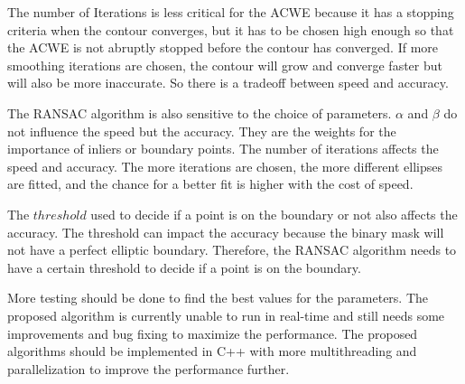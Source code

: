 The number of Iterations is less critical for the ACWE because it has a stopping criteria when the contour converges, but it has to be chosen high enough so that the ACWE is not abruptly stopped before the contour has converged. If more smoothing iterations are chosen, the contour will grow and converge faster but will also be more inaccurate. So there is a tradeoff between speed and accuracy. 

The RANSAC algorithm is also sensitive to the choice of parameters. $\alpha$ and $\beta$ do not influence the speed but the accuracy. They are the weights for the importance of inliers or boundary points. The number of iterations affects the speed and accuracy. The more iterations are chosen, the more different ellipses are fitted, and the chance for a better fit is higher with the cost of speed.

The $threshold$ used to decide if a point is on the boundary or not also affects the accuracy. The threshold can impact the accuracy because the binary mask will not have a perfect elliptic boundary. Therefore, the RANSAC algorithm needs to have a certain threshold to decide if a point is on the boundary. 

More testing should be done to find the best values for the parameters. The proposed algorithm is currently unable to run in real-time and still needs some improvements and bug fixing to maximize the performance. The proposed algorithms should be implemented in C++ with more multithreading and parallelization to improve the performance further. 